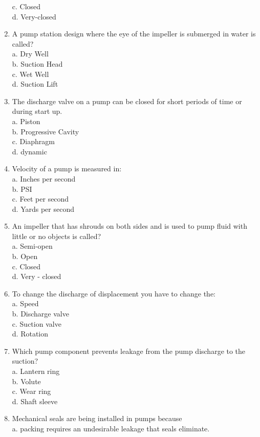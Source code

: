 \begin{enumerate}[1.]
c. Closed\\
d. Very-closed\\
\item A pump station design where the eye of the impeller is submerged in water is called?\\
a. Dry Well\\
b. Suction Head\\
c. Wet Well\\
d. Suction Lift\\
\item The discharge valve on a pump can be closed for short periods of time or during start up.\\
a. Piston\\
b. Progressive Cavity\\
c. Diaphragm\\
d. dynamic\\
\item Velocity of a pump is measured in:\\
a. Inches per second\\
b. PSI\\
c. Feet per second\\
d. Yards per second\\
\item An impeller that has shrouds on both sides and is used to pump fluid with little or no objects is called?\\
a. Semi-open\\
b. Open\\
c. Closed\\
d. Very - closed\\
\item To change the discharge of displacement you have to change the:\\
a. Speed\\
b. Discharge valve\\
c. Suction valve\\
d. Rotation\\
\item Which pump component prevents leakage from the pump discharge to the suction?\\
a. Lantern ring\\
b. Volute\\
c. Wear ring\\
d. Shaft sleeve\\
\item Mechanical seals are being installed in pumps because\\
a. packing requires an undesirable leakage that seals eliminate.\\

\end{enumerate}
